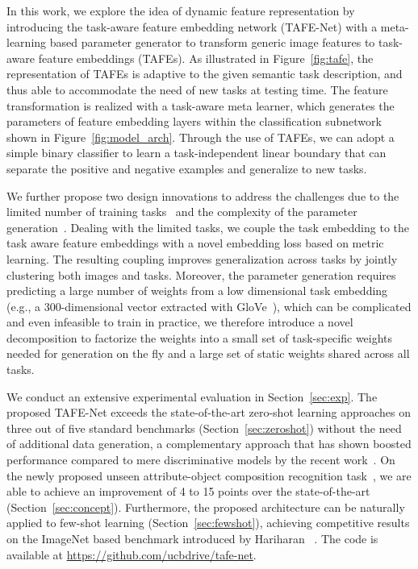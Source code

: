 \documentclass[10pt,twocolumn,letterpaper]{article}
\newcommand{\model}{TAFE-Net\xspace}
\begin{document}
In this work, we explore the idea of dynamic feature representation by introducing the task-aware feature embedding network (\model) with a meta-learning based 
parameter generator to transform generic image features to task-aware feature embeddings (TAFEs). As illustrated in Figure~\ref{fig:tafe}, the representation of TAFEs is adaptive to the given semantic task description, and thus able to accommodate the need of new tasks at testing time. The feature transformation is realized with a 
task-aware meta learner, which generates the parameters of feature embedding layers within the classification subnetwork shown in Figure~\ref{fig:model_arch}.  Through the use of TAFEs, we can adopt a simple binary classifier to learn a task-independent linear boundary that can separate the positive and negative examples and generalize to new tasks. 

We further propose two design innovations to address the challenges due to the limited number of training tasks~\cite{finn2017one} and the complexity of the parameter generation~\cite{bertinetto2016learning}. 
Dealing with the limited tasks, we couple the
task embedding to the task aware feature embeddings with a novel embedding loss based on metric
learning. The resulting coupling improves generalization across tasks by jointly clustering both images and
tasks. Moreover, the parameter generation requires predicting a large number of weights from a low dimensional task embedding (e.g., a 300-dimensional vector extracted with GloVe~\cite{pennington2014glove}), which can be 
complicated and even infeasible to train in practice, we therefore introduce a novel decomposition to factorize
the weights into a small set of task-specific weights needed for generation on the fly and a large set of static
weights shared across all tasks.

We conduct an extensive experimental evaluation in Section~\ref{sec:exp}. The proposed \model exceeds the state-of-the-art zero-shot learning approaches on three out of five standard benchmarks (Section~\ref{sec:zeroshot}) without the need of additional data generation, a complementary approach that has shown boosted performance compared to mere discriminative models by the recent work~\cite{xian2018feature}. On the newly proposed unseen attribute-object composition recognition task~\cite{misra2017red}, we are able to achieve an improvement of 4 to 15 points over the state-of-the-art (Section~\ref{sec:concept}). Furthermore, the proposed
architecture can be naturally applied to few-shot learning (Section~\ref{sec:fewshot}), achieving competitive results on the ImageNet based
benchmark introduced by Hariharan \etal~\cite{hariharan2017low}. 
The code is available at \href{https://github.com/ucbdrive/tafe-net}{https://github.com/ucbdrive/tafe-net}.
\end{document}
